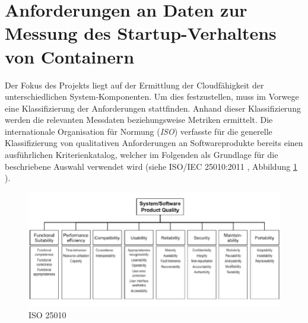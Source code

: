 \section{Anforderungen an Daten zur Messung des Startup-Verhaltens von Containern}
\label{sec:startupAnforderungen}


Der Fokus des Projekts liegt auf der Ermittlung der Cloudfähigkeit der unterschiedlichen System-Komponenten. Um dies festzustellen, muss im Vorwege eine Klassifizierung der Anforderungen stattfinden. Anhand dieser Klassifizierung werden die relevanten Messdaten beziehungsweise Metriken ermittelt. Die internationale Organisation für Normung (\emph{ISO}) verfasste für die generelle Klassifizierung von qualitativen Anforderungen an Softwareprodukte bereits einen ausführlichen Kriterienkatalog, welcher im Folgenden als Grundlage für die beschriebene Auswahl verwendet wird (siehe ISO/IEC 25010:2011 \cite{iso25010}, Abbildung \ref{fig:iso25010} ). 

\begin{figure}[ht!]
	\centering
	\includegraphics[width=\linewidth]{kapitel/vorgehensmodell/kriterienkatalog/_img/iso25010}
	\caption[iso25010]{ISO 25010 \cite{iso-img}}
	\label{fig:iso25010}
\end{figure}

